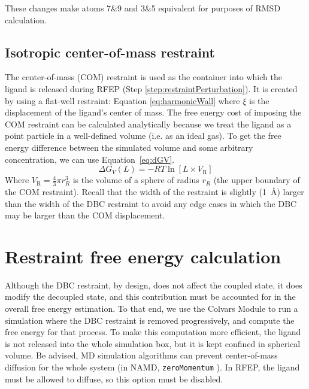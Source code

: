 \documentclass[9pt,tutorial]{Styling/livecoms}
\newcommand{\textInput}[1]{
  \texttt{#1}
}
\begin{document}
These changes make atoms 7\&9 and 3\&5 equivalent for purposes of RMSD calculation.

\subsection{Isotropic center-of-mass restraint} \label{app:COMCorrection}
The center-of-mass (COM) restraint is used as the container into which the ligand is released during RFEP (Step \ref{step:restraintPerturbation}). It is created by using a flat-well restraint: Equation \ref{eq:harmonicWall} where $\xi$ is the displacement of the ligand's center of mass.
The free energy cost of imposing the COM restraint can be calculated analytically because we treat the ligand as a point particle in a well-defined volume (i.e. as an ideal gas). 
To get the free energy difference between the simulated volume and some arbitrary concentration, we can use Equation~\ref{eq:dGV}.
 \begin{equation}\label{eq:dGV}
     \Delta G_V(L)=-RT \ln [L \times V_\mathrm{R}]
 \end{equation}
Where $V_\mathrm{R}=\frac{4}{3}\pi r_R^{3}$ is the volume of a sphere of radius $r_R$ (the upper boundary of the COM restraint). \cite{Salari2018} 
Recall that the width of the restraint is slightly (1~\AA{}) larger than the width of the DBC restraint to avoid any edge cases in which the DBC may be larger than the COM displacement.

\section{Restraint free energy calculation}\label{app:RFEP}

Although the DBC restraint, by design, does not affect the coupled state, it does modify the decoupled state, and this contribution must be accounted for in the overall free energy estimation. To that end, we use the Colvars Module to run a simulation where the DBC restraint is removed progressively, and compute the free energy for that process.
To make this computation more efficient, the ligand is not released into the whole simulation box, but it is kept confined in spherical volume. Be advised, MD simulation algorithms can prevent center-of-mass diffusion for the whole system (in NAMD, \textInput{zeroMomentum}). In RFEP, the ligand must be allowed to diffuse, so this option must be disabled.
\end{document}
